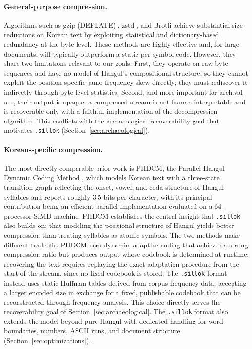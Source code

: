 \documentclass[conference]{IEEEtran}
\begin{document}
\paragraph{General-purpose compression.} Algorithms such as gzip (DEFLATE) \cite{gzip},
zstd \cite{zstd}, and Brotli \cite{brotli} achieve substantial size reductions on Korean text by
exploiting statistical and dictionary-based redundancy at the byte level.
These methods are highly effective and, for large documents, will typically
outperform a static per-symbol code. However, they share two limitations
relevant to our goals. First, they operate on raw byte sequences and have no
model of Hangul's compositional structure, so they cannot exploit the
position-specific jamo frequency skew directly; they must rediscover it
indirectly through byte-level statistics. Second, and more important for
archival use, their output is opaque: a compressed stream is not
human-interpretable and is recoverable only with a faithful implementation
of the decompression algorithm. This conflicts with the
archaeological-recoverability goal that motivates \texttt{.sillok}
(Section~\ref{sec:archaeological}).

\paragraph{Korean-specific compression.} The most directly comparable prior
work is PHDCM, the Parallel Hangul Dynamic Coding Method \cite{phdcm}, which
models Korean text with a three-state transition graph reflecting the
onset, vowel, and coda structure of Hangul syllables and reports roughly
3.5 bits per character, with its principal contribution being an efficient
parallel implementation evaluated on a 64-processor SIMD machine. PHDCM
establishes the central insight that \texttt{.sillok} also builds on: that
modeling the positional structure of Hangul yields better compression than
treating syllables as atomic symbols. The two methods make different
tradeoffs. PHDCM uses dynamic, adaptive coding that achieves a strong
compression ratio but produces output whose codebook is determined at
runtime; recovering the text requires replaying the exact adaptation
procedure from the start of the stream, since no fixed codebook is stored.
The \texttt{.sillok} format instead uses static Huffman tables derived from
corpus frequency data, accepting a larger encoded size in exchange for a
fixed, publishable codebook that can be reconstructed through frequency
analysis. This choice directly serves the recoverability goal of
Section~\ref{sec:archaeological}. The \texttt{.sillok} format also extends
the model beyond pure Hangul with dedicated handling for word boundaries,
numbers, ASCII runs, and document structure (Section~\ref{sec:optimizations}).
\end{document}
